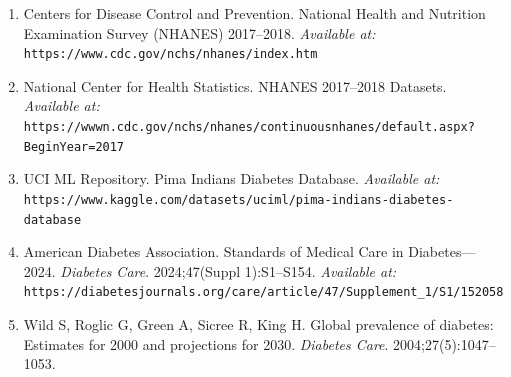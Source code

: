 \documentclass[12pt]{article}
\begin{document}
\begin{enumerate}
    \item Centers for Disease Control and Prevention. National Health and Nutrition Examination Survey (NHANES) 2017–2018. \textit{Available at:} \texttt{https://www.cdc.gov/nchs/nhanes/index.htm}
    
    \item National Center for Health Statistics. NHANES 2017–2018 Datasets. \textit{Available at:} \texttt{https://wwwn.cdc.gov/nchs/nhanes/continuousnhanes/default.aspx?BeginYear=2017}
    
    \item UCI ML Repository. Pima Indians Diabetes Database. \textit{Available at:} \texttt{https://www.kaggle.com/datasets/uciml/pima-indians-diabetes-database}
    
    \item American Diabetes Association. Standards of Medical Care in Diabetes—2024. \textit{Diabetes Care}. 2024;47(Suppl 1):S1–S154. \textit{Available at:} \texttt{https://diabetesjournals.org/care/article/47/Supplement\_1/S1/152058}
    
    \item Wild S, Roglic G, Green A, Sicree R, King H. Global prevalence of diabetes: Estimates for 2000 and projections for 2030. \textit{Diabetes Care}. 2004;27(5):1047–1053.
\end{enumerate}
\end{document}
